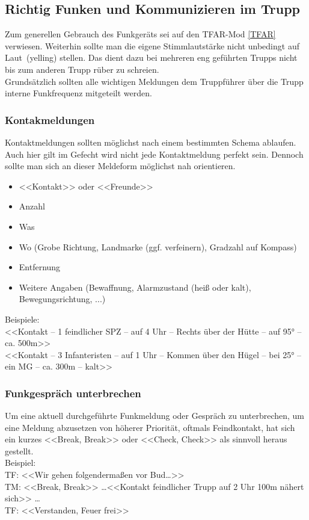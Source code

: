 \newpage
\subsection{Richtig Funken und Kommunizieren im Trupp}
	Zum generellen Gebrauch des Funkgeräts sei auf den TFAR-Mod \autoref{TFAR} verwiesen. Weiterhin sollte man die eigene Stimmlautstärke nicht unbedingt auf \glqq Laut\grqq\, (\glqq yelling\grqq) stellen. Das dient dazu bei mehreren eng geführten Trupps nicht bis zum anderen Trupp rüber zu schreien.\\
	Grundsätzlich sollten alle wichtigen Meldungen dem Truppführer über die Trupp interne Funkfrequenz mitgeteilt werden.

\subsubsection{Kontakmeldungen}
	Kontaktmeldungen  sollten möglichst nach einem bestimmten Schema ablaufen.  Auch hier gilt im Gefecht wird nicht jede Kontaktmeldung perfekt sein. Dennoch sollte man sich an dieser Meldeform möglichst nah orientieren.
		\begin{itemize}
		\item <<Kontakt>> oder <<Freunde>>
		\item Anzahl 
		\item Was
		\item Wo (Grobe Richtung, Landmarke (ggf. verfeinern), Gradzahl auf Kompass) 
		\item Entfernung
		\item Weitere Angaben (Bewaffnung, Alarmzustand (heiß oder kalt), Bewegungsrichtung, ...)
	\end{itemize}

	Beispiele:\\
	<<Kontakt -- 1 feindlicher \acs{SPZ} -- auf 4 Uhr -- Rechts über der Hütte -- auf 95° -- ca. 500m>> \\
	<<Kontakt -- 3 Infanteristen -- auf 1 Uhr -- Kommen über den Hügel -- bei 25° -- ein \acs{MG} -- ca. 300m -- kalt>>

\subsubsection{Funkgespräch unterbrechen}
	Um eine aktuell durchgeführte Funkmeldung oder Gespräch zu unterbrechen, um eine Meldung abzusetzen von höherer Priorität, oftmals Feindkontakt, hat sich ein kurzes <<Break, Break>> oder <<Check, Check>> als sinnvoll heraus gestellt. \\
	Beispiel: \\
	TF: <<Wir gehen folgendermaßen vor Bud…>>  \\
	TM: <<Break, Break>> \dots <<Kontakt feindlicher Trupp auf 2 Uhr  100m nähert sich>> \dots  \\
	TF: <<Verstanden, Feuer frei>>

